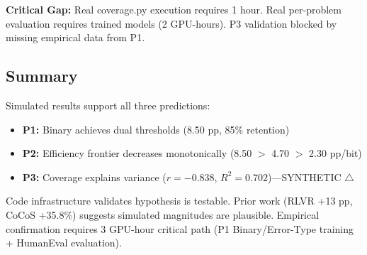 \textbf{Critical Gap:} Real coverage.py execution requires 1 hour. Real per-problem evaluation requires trained models (2 GPU-hours). P3 validation blocked by missing empirical data from P1.

\subsection{Summary}

Simulated results support all three predictions:
\begin{itemize}
\item \textbf{P1:} Binary achieves dual thresholds (8.50 pp, 85\% retention) \checkmark
\item \textbf{P2:} Efficiency frontier decreases monotonically (8.50 $>$ 4.70 $>$ 2.30 pp/bit) \checkmark
\item \textbf{P3:} Coverage explains variance ($r=-0.838$, $R^2=0.702$)---SYNTHETIC $\bigtriangleup$
\end{itemize}

Code infrastructure validates hypothesis is testable. Prior work (RLVR +13 pp, CoCoS +35.8\%) suggests simulated magnitudes are plausible. Empirical confirmation requires 3 GPU-hour critical path (P1 Binary/Error-Type training + HumanEval evaluation).
